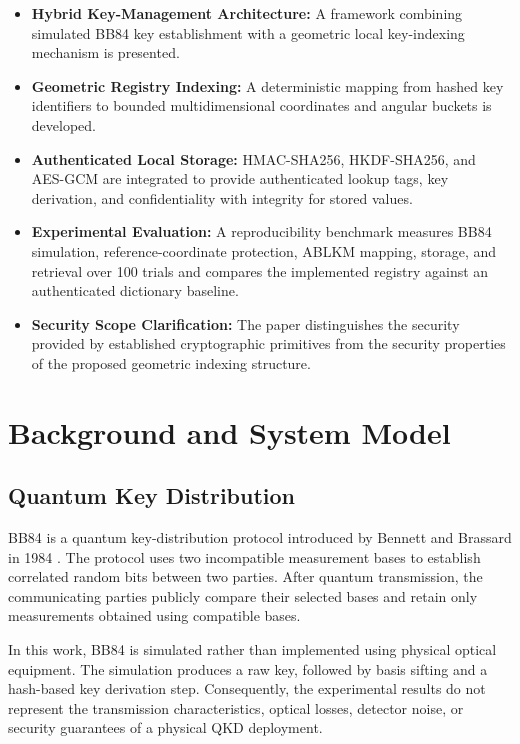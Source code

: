 \documentclass[journal,twocolumn]{IEEEtran}
\begin{document}
\begin{itemize}
    \item \textbf{Hybrid Key-Management Architecture:} A framework combining simulated BB84 key establishment with a geometric local key-indexing mechanism is presented.
    
    \item \textbf{Geometric Registry Indexing:} A deterministic mapping from hashed key identifiers to bounded multidimensional coordinates and angular buckets is developed.
    
    \item \textbf{Authenticated Local Storage:} HMAC-SHA256, HKDF-SHA256, and AES-GCM are integrated to provide authenticated lookup tags, key derivation, and confidentiality with integrity for stored values.
    
    \item \textbf{Experimental Evaluation:} A reproducibility benchmark measures BB84 simulation, reference-coordinate protection, ABLKM mapping, storage, and retrieval over 100 trials and compares the implemented registry against an authenticated dictionary baseline.
    
    \item \textbf{Security Scope Clarification:} The paper distinguishes the security provided by established cryptographic primitives from the security properties of the proposed geometric indexing structure.
\end{itemize}

\section{Background and System Model}

\subsection{Quantum Key Distribution}

BB84 is a quantum key-distribution protocol introduced by Bennett and Brassard in 1984 \cite{bennett1984}. The protocol uses two incompatible measurement bases to establish correlated random bits between two parties. After quantum transmission, the communicating parties publicly compare their selected bases and retain only measurements obtained using compatible bases.

In this work, BB84 is simulated rather than implemented using physical optical equipment. The simulation produces a raw key, followed by basis sifting and a hash-based key derivation step. Consequently, the experimental results do not represent the transmission characteristics, optical losses, detector noise, or security guarantees of a physical QKD deployment.
\end{document}
